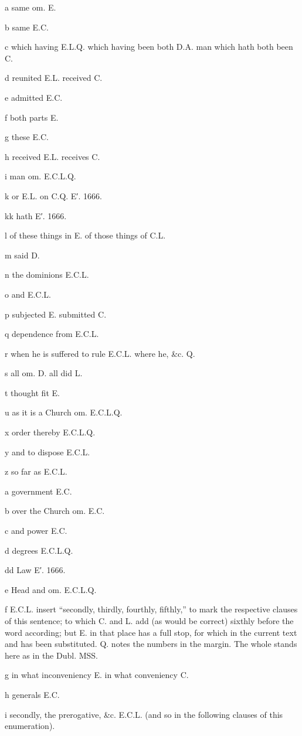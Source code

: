 a
same om. E.

b
same E.C.

c
which having E.L.Q. which having been both D.A. man which hath both been C.

d
reunited E.L. received C.

e
admitted E.C.

f
both parts E.

g
these E.C.

h
received E.L. receives C.

i
man om. E.C.L.Q.

k
or E.L. on C.Q. E′. 1666.

kk
hath E′. 1666.

l
of these things in E. of those things of C.L.

m
said D.

n
the dominions E.C.L.

o
and E.C.L.

p
subjected E. submitted C.

q
dependence from E.C.L.

r
when he is suffered to rule E.C.L. where he, &c. Q.

s
all om. D. all did L.

t
thought fit E.

u
as it is a Church om. E.C.L.Q.

x
order thereby E.C.L.Q.

y
and to dispose E.C.L.

z
so far as E.C.L.

a
government E.C.

b
over the Church om. E.C.

c
and power E.C.

d
degrees E.C.L.Q.

dd
Law E′. 1666.

e
Head and om. E.C.L.Q.

f
E.C.L. insert “secondly, thirdly, fourthly, fifthly,” to mark the respective clauses of this sentence; to which C. and L. add (as would be correct) sixthly before the word according; but E. in that place has a full stop, for which in the current text and has been substituted. Q. notes the numbers in the margin. The whole stands here as in the Dubl. MSS.

g
in what inconveniency E. in what conveniency C.

h
generals E.C.

i
secondly, the prerogative, &c. E.C.L. (and so in the following clauses of this enumeration).

